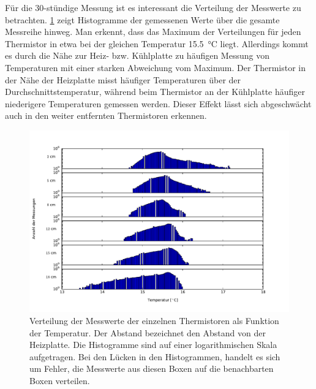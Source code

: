 Für die 30-stündige Messung ist es interessant die Verteilung der Messwerte zu betrachten. \cref{fig:hist} zeigt Histogramme der gemessenen Werte über die gesamte Messreihe hinweg. Man erkennt, dass das Maximum der Verteilungen für jeden Thermistor in etwa bei der gleichen Temperatur \SI{15.5}{\celsius} liegt. 
Allerdings kommt es durch die Nähe zur Heiz- bzw. Kühlplatte zu häufigen Messung von Temperaturen mit einer starken Abweichung vom Maximum.
Der Thermistor in der Nähe der Heizplatte misst häufiger Temperaturen über der Durchschnittstemperatur, während beim Thermistor an der Kühlplatte häufiger niederigere Temperaturen gemessen werden.
Dieser Effekt lässt sich abgeschwächt auch in den weiter entfernten Thermistoren erkennen.
\begin{figure}
	\centering
	\includegraphics[width=\textwidth]{plots/T_hist.pdf}\caption{Verteilung der Messwerte der einzelnen Thermistoren als Funktion der Temperatur. Der Abstand bezeichnet den Abstand von der Heizplatte. Die Histogramme sind auf einer logarithmischen Skala aufgetragen. Bei den Lücken in den Histogrammen, handelt es sich um Fehler, die Messwerte aus diesen Boxen auf die benachbarten Boxen verteilen.}\label{fig:hist}
\end{figure}

